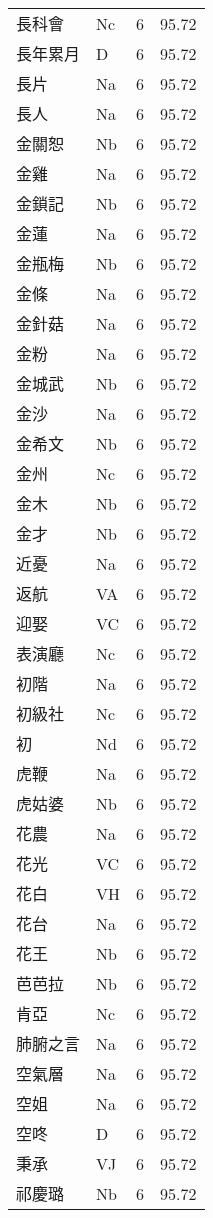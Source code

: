 \documentclass[twocolumn]{book}
\begin{document}
\begin{supertabular}{llrr}
長科會 & Nc & 6 &  95.72\\
長年累月 & D & 6 &  95.72\\
長片 & Na & 6 &  95.72\\
長人 & Na & 6 &  95.72\\
金關恕 & Nb & 6 &  95.72\\
金雞 & Na & 6 &  95.72\\
金鎖記 & Nb & 6 &  95.72\\
金蓮 & Na & 6 &  95.72\\
金瓶梅 & Nb & 6 &  95.72\\
金條 & Na & 6 &  95.72\\
金針菇 & Na & 6 &  95.72\\
金粉 & Na & 6 &  95.72\\
金城武 & Nb & 6 &  95.72\\
金沙 & Na & 6 &  95.72\\
金希文 & Nb & 6 &  95.72\\
金州 & Nc & 6 &  95.72\\
金木 & Nb & 6 &  95.72\\
金才 & Nb & 6 &  95.72\\
近憂 & Na & 6 &  95.72\\
返航 & VA & 6 &  95.72\\
迎娶 & VC & 6 &  95.72\\
表演廳 & Nc & 6 &  95.72\\
初階 & Na & 6 &  95.72\\
初級社 & Nc & 6 &  95.72\\
初 & Nd & 6 &  95.72\\
虎鞭 & Na & 6 &  95.72\\
虎姑婆 & Nb & 6 &  95.72\\
花農 & Na & 6 &  95.72\\
花光 & VC & 6 &  95.72\\
花白 & VH & 6 &  95.72\\
花台 & Na & 6 &  95.72\\
花王 & Nb & 6 &  95.72\\
芭芭拉 & Nb & 6 &  95.72\\
肯亞 & Nc & 6 &  95.72\\
肺腑之言 & Na & 6 &  95.72\\
空氣層 & Na & 6 &  95.72\\
空姐 & Na & 6 &  95.72\\
空咚 & D & 6 &  95.72\\
秉承 & VJ & 6 &  95.72\\
祁慶璐 & Nb & 6 &  95.72\\

\end{supertabular}
\end{document}
